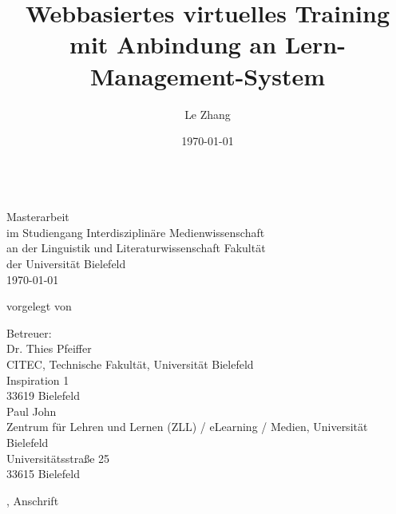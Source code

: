 \begin{titlepage}

\title{Webbasiertes virtuelles Training mit Anbindung an Lern-Management-System}
\author{Le Zhang}
\date{\today}

\dimendef{}
\begin{center}
\thispagestyle{empty}

{\fontsize{24.88}{28}
 \thetitle\\[0.5cm]
}
\fontsize{12}{12}
\vspace{1cm}
Masterarbeit\\
im Studiengang Interdisziplinäre Medienwissenschaft\\
an der Linguistik und Literaturwissenschaft Fakultät\\
der Universität Bielefeld\\

\vspace{1.5cm} \today

\vspace{1cm}
vorgelegt von\\
\theauthor

\vspace{3cm}
Betreuer:\\
Dr. Thies Pfeiffer\\
CITEC, Technische Fakultät, Universität Bielefeld\\
Inspiration 1\\
33619 Bielefeld\\
\vspace{.2cm}
Paul John\\
Zentrum für Lehren und Lernen (ZLL) / eLearning / Medien, Universität Bielefeld\\
Universitätsstraße 25\\
33615 Bielefeld


\vspace{2cm}
{\small \theauthor, Anschrift}
\end{center}
\end{titlepage}
